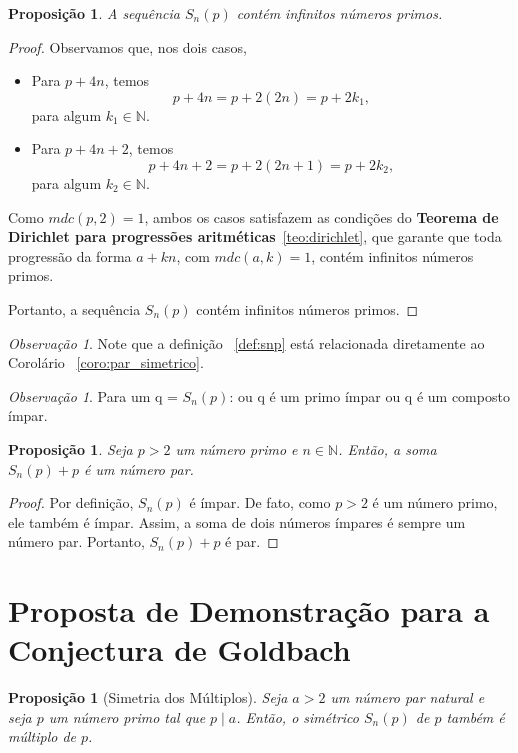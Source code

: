 \documentclass[a4paper,11pt]{article}
\newtheorem{proposition}[theorem]{Proposição}
\theoremstyle{definition}
\theoremstyle{remark}
\newtheorem{remark}[theorem]{Observação}
\begin{document}
\begin{otherlanguage}{brazil}
	\vspace{0.5cm}
	
	\begin{proposition}
		A sequência \(S_n(p)\) contém infinitos números primos.
	\end{proposition}
	
	\begin{proof}
		Observamos que, nos dois casos,
		\begin{itemize}
			\item Para \(p + 4n\), temos
			\[
			p + 4n = p + 2(2n) = p + 2k_1,
			\]
			para algum \(k_1 \in \mathbb{N}\).
			
			\item Para \(p + 4n + 2\), temos
			\[
			p + 4n + 2 = p + 2(2n + 1) = p + 2k_2,
			\]
			para algum \(k_2 \in \mathbb{N}\).
		\end{itemize}
		
		Como \(mdc(p, 2) = 1\), ambos os casos satisfazem as condições do  \textbf{Teorema de Dirichlet para progressões aritméticas}~\ref{teo:dirichlet}, que garante que toda progressão da forma \(a + kn\), com \(mdc(a, k) = 1\), contém infinitos números primos.
		
		Portanto, a sequência \(S_n(p)\) contém infinitos números primos.
	\end{proof}
	
	\begin{remark}
		Note que a definição ~\ref{def:snp} está relacionada diretamente ao Corolário ~\ref{coro:par_simetrico}.
	\end{remark}
	
	\begin{remark}
		Para um q = \(S_n(p)\): ou q é um primo ímpar ou q é um composto ímpar.
	\end{remark}
	
	\begin{proposition}
		Seja \( p > 2 \) um número primo e \( n \in \mathbb{N} \). Então, a soma \( S_n(p) + p \) é um número par.
	\end{proposition}
	
	
	\begin{proof}
		Por definição, \( S_n(p) \) é ímpar. De fato, como \( p > 2 \) é um número primo, ele também é ímpar. Assim, a soma de dois números ímpares é sempre um número par. Portanto, \( S_n(p) + p \) é par. 
	\end{proof}
	
	
	\section{Proposta de Demonstração para a Conjectura de Goldbach}
	\begin{proposition}[Simetria dos Múltiplos]
		Seja \(a > 2\) um número par natural e seja \(p\) um número primo tal que \(p \mid a\). Então, o simétrico \(S_n(p)\) de \(p\) também é múltiplo de \(p\).
	\end{proposition}
	

\end{otherlanguage}
\end{document}
